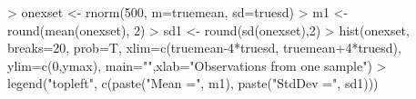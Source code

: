 \begin{Schunk}
\begin{Sinput}
> onexset <- rnorm(500, m=truemean, sd=truesd)
> m1 <- round(mean(onexset), 2)
> sd1 <- round(sd(onexset),2)
> hist(onexset, breaks=20, prob=T, xlim=c(truemean-4*truesd, truemean+4*truesd), ylim=c(0,ymax), main="",xlab="Observations from one sample")
> legend("topleft", c(paste("Mean =", m1), paste("StdDev =", sd1)))
\end{Sinput}
\end{Schunk}
